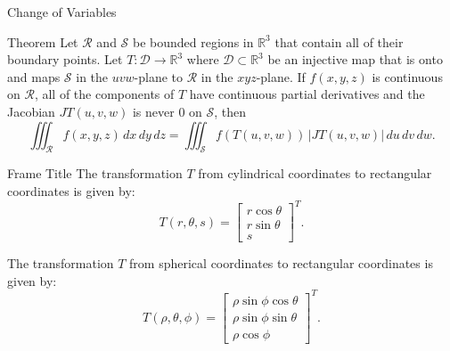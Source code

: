 \documentclass{beamer}
\begin{document}
\begin{frame}{Change of Variables}
    \begin{block}{Theorem}
        Let $\mathcal{R}$ and $\mathcal{S}$ be bounded regions in $\mathbb{R}^3$ that contain all of their boundary points. Let $T : \mathcal{D} \rightarrow \mathbb{R}^3$ where $\mathcal{D} \subset \mathbb{R}^3$ be an injective map that is onto and maps $\mathcal{S}$ in the $uvw$-plane to $\mathcal{R}$ in the $xyz$-plane. If $f(x, y, z)$ is continuous on $\mathcal{R}$, all of the components of $T$ have continuous partial derivatives and the Jacobian $JT(u, v, w)$ is never $0$ on $\mathcal{S}$, then
\[
\iiint_{\mathcal{R}} f(x, y, z) \, dx \, dy \, dz = \iiint_{\mathcal{S}} f(T(u, v, w)) \, \left| JT(u, v, w) \right| \, du \, dv \, dw.
\]
    \end{block}
\end{frame}
\begin{frame}{Frame Title}
    The transformation \(T\) from cylindrical coordinates to rectangular coordinates is given by:
\[ T(r, \theta,s) = \begin{bmatrix} r \cos \theta \\ r \sin \theta \\ s \end{bmatrix}^T. \]

The transformation \(T\) from spherical coordinates to rectangular coordinates is given by:
\[ T(\rho, \theta, \phi) = \begin{bmatrix} \rho \sin \phi \cos \theta \\ \rho \sin \phi \sin \theta \\ \rho \cos \phi \end{bmatrix}^T. \]
\end{frame}
\end{document}
